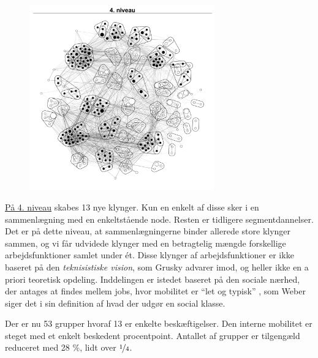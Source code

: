 \begin{figure}
  \vspace{-20pt}
  \begin{center}
    \includegraphics[width=8cm]{fig/netvaerkskort/kort_seg_proces4.pdf}
   \caption{}
   \label{fig_delanalyse1_kort_seg_proces4}
  \end{center}
  \vspace{-20pt}
\end{figure}

\underline{På 4. niveau} skabes 13 nye klynger. Kun en enkelt af disse sker i en sammenlægning med en enkeltstående node. Resten er tidligere segmentdannelser. Det er på dette niveau, at sammenlægningerne binder allerede store klynger sammen, og vi får udvidede klynger med en betragtelig mængde forskellige arbejdsfunktioner samlet under ét. Disse klynger af arbejdsfunktioner er ikke baseret på den \emph{teknisistiske vision}, som Grusky advarer imod, og heller ikke en a priori teoretisk opdeling. Inddelingen er istedet baseret på den sociale nærhed, der antages at findes mellem jobs, hvor mobilitet er “let og typisk” , som Weber siger det i sin definition af hvad der udgør en social klasse. %
%
%
 
Der er nu 53 grupper hvoraf 13 er enkelte beskæftigelser. Den interne mobilitet er steget med et enkelt beskedent procentpoint. Antallet af grupper er tilgengæld reduceret med 28 \%, lidt over $\nicefrac{1}{4}$.

